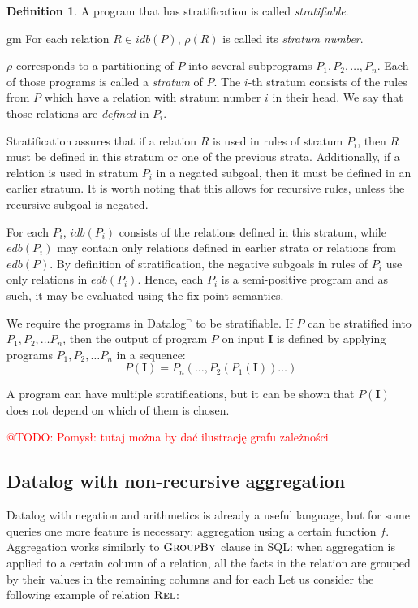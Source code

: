 \documentclass{pracamgr}
\makeatletter
\theoremstyle{plain}
\theoremstyle{definition}
\newtheorem{defn}{Definition}[section]
\theoremstyle{remark}
\newcommand{\todo}[1]{\textcolor{red}{@TODO: #1}}
\newcommand{\datalogneg}{Datalog$^{\neg}$ }
\makeatother
\begin{document}
\begin{defn}
A program that has stratification is called \emph{stratifiable}.
\end{defn}
gm
For each relation $R \in idb(P )$, $\rho(R)$ is called its \emph{stratum number}.

$\rho$ corresponds to a partitioning of $P$ into several subprograms $P_1, P_2, \dots, P_n$. Each of those programs is called a \emph{stratum} of $P$. The $i$-th stratum consists of the rules from $P$ which have a relation with stratum number $i$ in their head. We say that those relations are \emph{defined} in $P_i$.

Stratification assures that if a relation $R$ is used in rules of stratum $P_i$, then $R$ must be defined in this stratum or one of the previous strata. Additionally, if a relation is used in stratum $P_i$ in a negated subgoal, then it must be defined in an earlier stratum. It is worth noting that this allows for recursive rules, unless the recursive subgoal is negated.

For each $P_i$, $idb(P_i)$ consists of the relations defined in this stratum, while $edb(P_i)$ may contain only relations defined in earlier strata or relations from $edb(P)$. By definition of stratification, the negative subgoals in rules of $P_i$ use only relations in $edb(P_i)$. Hence, each $P_i$ is a semi-positive program and as such, it may be evaluated using the fix-point semantics.

We require the programs in \datalogneg to be stratifiable. If $P$ can be stratified into $P_1, P_2, \dots P_n$, then the output of program $P$ on input $\textbf{I}$ is defined by applying programs $P_1, P_2, \dots P_n$ in a sequence:
$$P(\textbf{I}) = P_n(\dots, P_2(P_1(\textbf{I}))\dots)$$

A program can have multiple stratifications, but it can be shown that $P(\textbf{I})$ does not depend on which of them is chosen.

\todo{Pomysł: tutaj można by dać ilustrację grafu zależności}

\subsection{Datalog with non-recursive aggregation}\label{ss:datalognra}

Datalog with negation and arithmetics is already a useful language, but for some queries one more feature is necessary: aggregation using a certain function $f$. Aggregation works similarly to $\textsc{GroupBy}$ clause in SQL: when aggregation is applied to a certain column of a relation, all the facts in the relation are grouped by their values in the remaining columns and for each 
Let us consider the following example of relation $\textsc{Rel}$:
\end{document}

